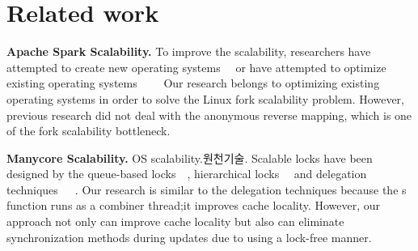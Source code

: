\section{Related work} \label{sec:RelatedWork}

\ifkor
\noindent
\textbf{Apache Spark Scalability.}
To improve the scalability, researchers have attempted to create new
operating systems~\cite{Boyd-WickizerCorey}~\cite{Wentzlaff2010fOS}
or have
attempted to optimize existing operating systems~\cite{SilasBoydWickizer2010LinuxScales48}~\cite{AustinTClements2012RCUBalancedTrees}~\cite{Clements2013RadixVM}~\cite{SilasBoydWickizerPth}
Our research belongs to optimizing existing operating systems in order to
solve the Linux fork scalability problem.
However, previous research did not deal with the anonymous reverse mapping,
which is one of the fork scalability bottleneck.

\else

\fi

\ifkor
\noindent
\textbf{Manycore Scalability.}
OS scalability.원천기술.
Scalable locks have been designed by the
queue-based locks~\cite{MellorCrummey1991MCS}~\cite{Magnusson1994QLC},
hierarchical locks~\cite{Radovic2003HBL}~\cite{Chabbi2016CLL} and
delegation techniques~\cite{Hendler2010FC}~\cite{Fatourou2012RCS}~\cite{Delegation2014}.
Our research is similar to the delegation techniques because
the s  function runs as a
combiner thread;it improves cache locality.
However, our approach not only can improve cache locality but also
can eliminate synchronization methods during updates due to using a lock-free manner.

